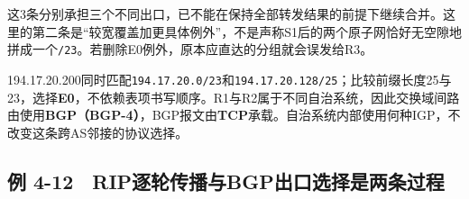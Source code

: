 这3条分别承担三个不同出口，已不能在保持全部转发结果的前提下继续合并。这里的第二条是``较宽覆盖加更具体例外''，不是声称S1后的两个原子网恰好无空隙地拼成一个\texttt{/\allowbreak{}23}。若删除E0例外，原本应直达的分组就会误发给R3。

194.17.20.200同时匹配\texttt{194.17.20.0/\allowbreak{}23}和\texttt{194.17.20.128/\allowbreak{}25}；比较前缀长度25与23，选择\textbf{E0}，不依赖表项书写顺序。R1与R2属于不同自治系统，因此交换域间路由使用\textbf{BGP（BGP-4）}，BGP报文由\textbf{TCP}承载。自治系统内部使用何种IGP，不改变这条跨AS邻接的协议选择。

\subsection{例 4-12　RIP逐轮传播与BGP出口选择是两条过程}\label{CN04-ex12}

